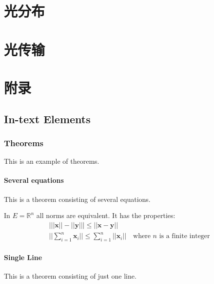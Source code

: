 \documentclass[11pt,twoside]{book} %
\begin{document}


\part{光分布}






\part{光传输}






\part{附录}


\chapter{In-text Elements}

\section{Theorems}

This is an example of theorems.

\subsection{Several equations}
This is a theorem consisting of several equations.

\begin{theorem}
    In $E=\mathbb{R}^n$ all norms are equivalent. It has the properties:
    \begin{align}
         & \big| ||\mathbf{x}|| - ||\mathbf{y}|| \big|\leq || \mathbf{x}- \mathbf{y}||                            \\
         & ||\sum_{i=1}^n\mathbf{x}_i||\leq \sum_{i=1}^n||\mathbf{x}_i||\quad\text{where $n$ is a finite integer}
    \end{align}
\end{theorem}

\subsection{Single Line}
This is a theorem consisting of just one line.
\end{document}
